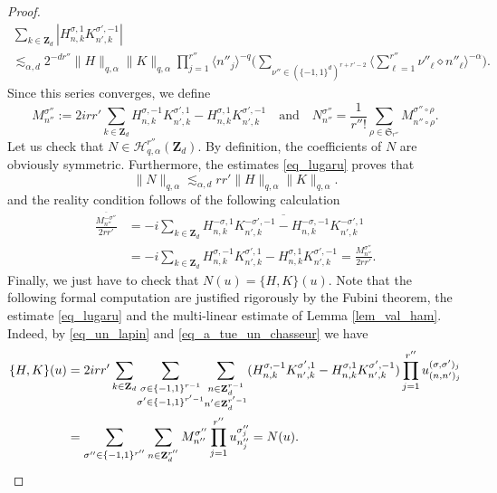 \documentclass[11pt]{article}
\theoremstyle{definition}
\begin{document}
\begin{proof}
\begin{multline}
\sum_{k\in \mathbf{Z}_d}|H_{n,k}^{\sigma,1} K_{n',k}^{\sigma',-1}|\\[-15pt] \lesssim_{\alpha,d} 2^{-dr''}\| H \|_{q,\alpha} \|K \|_{q,\alpha}\prod_{j=1}^{r''} \langle n''_j \rangle^{-q}
\Big(\! \! \! \! \! \! \! \! \! \! \! \! \! \sum_{\nu'' \in (\{-1,1\}^d)^{r+r'-2} } \! \! \big\langle \sum_{\ell =1}^{r''} \nu''_{\ell} \diamond n''_{\ell} \big\rangle^{-\alpha} \Big).
\end{multline}
Since this series converges, we define
\[
M_{n''}^{\sigma''}:= 2 i r r' \sum_{k\in \mathbf{Z}_d} H_{n,k}^{\sigma,-1} K_{n',k}^{\sigma',1} - H_{n,k}^{\sigma,1} K_{n',k}^{\sigma',-1} \quad \text{and} \quad N_{n''}^{\sigma''} = \frac1{r'' !} \sum_{\rho \in \mathfrak{S}_{r''}} M_{n''\circ \rho}^{\sigma''\circ \rho}.
\]
Let us check that $N\in \mathscr{H}_{q,\alpha}^{r''}(\mathbf{Z}_d)$. By definition, the coefficients of $N$ are obviously symmetric. Furthermore, the estimates \eqref{eq_lugaru} proves that
\[
\| N\|_{q,\alpha} \lesssim_{\alpha,d} r r' \| H \|_{q,\alpha} \|K \|_{q,\alpha}.
\]
and the reality condition follows of the following calculation
\begin{equation*}
\begin{split}
\frac{\overline{M_{n''}^{-\sigma''} }}{2rr'} &= -i \sum_{k\in \mathbf{Z}_d} \overline{H_{n,k}^{-\sigma,1} K_{n',k}^{-\sigma',-1} - H_{n,k}^{-\sigma,-1} K_{n',k}^{-\sigma',1}}
\\ &= -i \sum_{k\in \mathbf{Z}_d} H_{n,k}^{\sigma,-1} K_{n',k}^{\sigma',1} - H_{n,k}^{\sigma,1} K_{n',k}^{\sigma',-1} = \frac{M_{n''}^{\sigma''}}{2rr'}.
\end{split}
\end{equation*}
Finally, we just have to check that $N(u) = \{ H,K\}(u) $. Note that the following formal computation are justified rigorously by the Fubini theorem, the estimate \eqref{eq_lugaru} and the multi-linear estimate of Lemma \ref{lem_val_ham}. Indeed, by \eqref{eq_un_lapin} and \eqref{eq_a_tue_un_chasseur} we have
\begin{align*}
\{ H,K\}(u) &= 2irr' \sum_{k\in \mathbf{Z}_d} \! \sum_{\substack{\sigma \in \{-1,1\}^{r-1}\\ \sigma' \in \{-1,1\}^{r'-1} }} \! \sum_{\substack{n\in \mathbf{Z}_d^{r-1} \\ n'\in \mathbf{Z}_d^{r'-1} }} (H_{n,k}^{\sigma,-1} K_{n',k}^{\sigma',1} -H_{n,k}^{\sigma,1} K_{n',k}^{\sigma',-1}) \prod_{j=1}^{r''} u_{(n,n')_j}^{(\sigma,\sigma')_j} \\
&= \sum_{\sigma'' \in \{-1,1\}^{r''}} \sum_{n\in \mathbf{Z}_d^{r''} } M_{n''}^{\sigma''}\prod_{j=1}^{r''} u_{n''_j}^{\sigma''_j} = N(u).\qedhere
\end{align*}
\end{proof}
\end{document}
